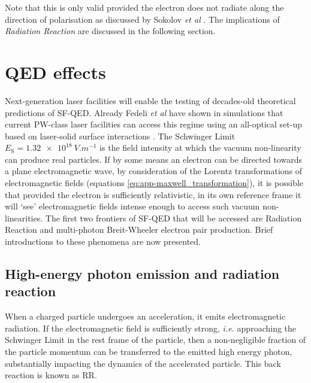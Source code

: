 Note that this is only valid provided the electron does not radiate along the direction of polarisation as discussed by Sokolov \textit{et al} \cite{sokolovDynamicsEmittingElectrons2009}. The implications of \textit{Radiation Reaction }are discussed in the following section.

\section{QED effects}
Next-generation laser facilities will enable the testing of decades-old theoretical predictions of \ac{SF-QED}. Already Fedeli \textit{et al} have shown in simulations that current PW-class laser facilities can access this regime using an all-optical set-up based on laser-solid surface interactions \cite{fedeliProbingStrongfieldQED2020}. The Schwinger Limit $E_\mathrm{S} = \qty{1.32e18}{V.m^{-1}}$ is the field intensity at which the vacuum non-linearity can produce real particles. If by some means an electron can be directed towards a plane electromagnetic wave, by consideration of the Lorentz transformations of electromagnetic fields (equations \ref{eq:app-maxwell_transformation}), it is possible that provided the electron is sufficiently relativistic, in its own reference frame it will `see' electromagnetic fields intense enough to access such vacuum non-linearities. The first two frontiers of SF-QED that will be accessed are Radiation Reaction and multi-photon Breit-Wheeler electron pair production. Brief introductions to these phenomena are now presented.

\subsection{High-energy photon emission and radiation reaction}
When a charged particle undergoes an acceleration, it emits electromagnetic radiation. If the electromagnetic field is sufficiently strong, \textit{i.e.} approaching the Schwinger Limit in the rest frame of the particle, then a non-negligible fraction of the particle momentum can be transferred to the emitted high energy photon, substantially impacting the dynamics of the accelerated particle. This back reaction is known as \ac{RR}.

